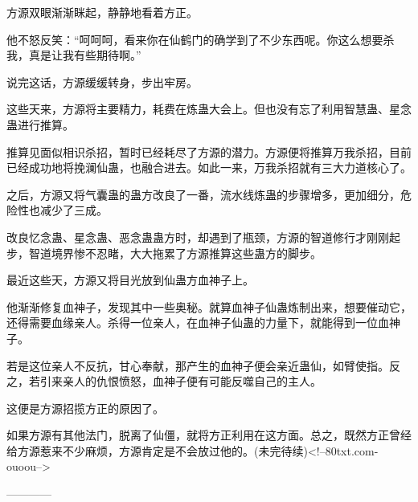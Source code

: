 \begin{this_body}
方源双眼渐渐眯起，静静地看着方正。

他不怒反笑：“呵呵呵，看来你在仙鹤门的确学到了不少东西呢。你这么想要杀我，真是让我有些期待啊。”

说完这话，方源缓缓转身，步出牢房。

这些天来，方源将主要精力，耗费在炼蛊大会上。但也没有忘了利用智慧蛊、星念蛊进行推算。

推算见面似相识杀招，暂时已经耗尽了方源的潜力。方源便将推算万我杀招，目前已经成功地将挽澜仙蛊，也融合进去。如此一来，万我杀招就有三大力道核心了。

之后，方源又将气囊蛊的蛊方改良了一番，流水线炼蛊的步骤增多，更加细分，危险性也减少了三成。

改良忆念蛊、星念蛊、恶念蛊蛊方时，却遇到了瓶颈，方源的智道修行才刚刚起步，智道境界惨不忍睹，大大拖累了方源推算这些蛊方的脚步。

最近这些天，方源又将目光放到仙蛊方血神子上。

他渐渐修复血神子，发现其中一些奥秘。就算血神子仙蛊炼制出来，想要催动它，还得需要血缘亲人。杀得一位亲人，在血神子仙蛊的力量下，就能得到一位血神子。

若是这位亲人不反抗，甘心奉献，那产生的血神子便会亲近蛊仙，如臂使指。反之，若引来亲人的仇恨愤怒，血神子便有可能反噬自己的主人。

这便是方源招揽方正的原因了。

如果方源有其他法门，脱离了仙僵，就将方正利用在这方面。总之，既然方正曾经给方源惹来不少麻烦，方源肯定是不会放过他的。(未完待续)<!--80txt.com-ouoou-->

------------

\end{this_body}

